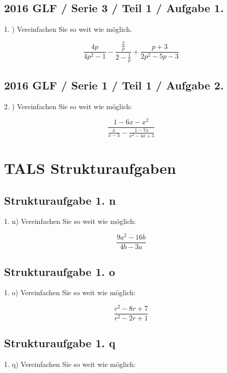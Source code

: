 {\subsection*{2016 GLF / Serie 3 / Teil 1 / Aufgabe 1.}

1. ) Vereinfachen Sie so weit wie möglich.

$$\frac{4p}{4p^2-1} - \frac{\frac2p}{2-\frac1p} + \frac{p+3}{2p^2-5p-3}$$


\subsection*{2016 GLF / Serie 1 / Teil 1 / Aufgabe 2.}

2. ) Vereinfachen Sie so weit wie möglich:

$$\frac{1-6x-x^2}{\frac{x}{x-3} - \frac{1-7x}{x^2-4x+3}}$$

\newpage
\section*{TALS Strukturaufgaben}

\subsection*{Strukturaufgabe 1. n}

1. n) Vereinfachen Sie so weit wie möglich:

$$\frac{9a^2-16b}{4b-3a}$$


\subsection*{Strukturaufgabe 1. o}

1. o) Vereinfachen Sie so weit wie möglich:

$$\frac{r^2-8r+7}{r^2-2r+1}$$


\subsection*{Strukturaufgabe 1. q}

1. q) Vereinfachen Sie so weit wie möglich:

}
